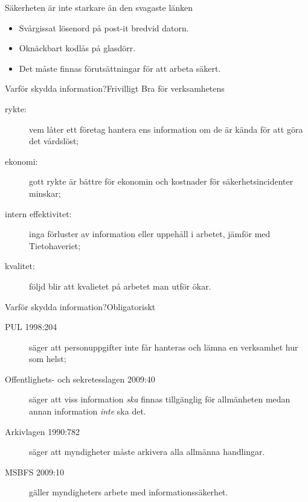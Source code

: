 \documentclass{beamer}
\begin{document}
\begin{frame}{Säkerheten är inte starkare än den svagaste länken}
  \begin{itemize}
    \item Svårgissat lösenord på post-it bredvid datorn.
    \item Oknäckbart kodlås på glasdörr.
    \item Det måste finnas förutsättningar för att arbeta säkert.
  \end{itemize}
\end{frame}

\begin{frame}{Varför skydda information?}{Frivilligt}
  Bra för verksamhetens
  \begin{description}
    \item[rykte:] vem låter ett företag hantera ens information om de är kända 
      för att göra det vårdslöst;

    \item[ekonomi:] gott rykte är bättre för ekonomin och kostnader för 
      säkerhetsincidenter minskar;

    \item[intern effektivitet:] inga förluster av information eller uppehåll 
      i arbetet, jämför med Tietohaveriet;

    \item[kvalitet:] följd blir att kvalietet på arbetet man utför ökar.

  \end{description}
\end{frame}

\begin{frame}{Varför skydda information?}{Obligatoriskt}
  \begin{description}
    \item[PUL 1998:204] säger att personuppgifter inte får hanteras och lämna 
      en verksamhet hur som helst;

    \item[Offentlighets- och sekretesslagen 2009:40] säger att viss information 
      \emph{ska} finnas tillgänglig för allmänheten medan annan information 
      \emph{inte} ska det.

    \item[Arkivlagen 1990:782] säger att myndigheter måste arkivera alla 
      allmänna handlingar.

    \item[MSBFS 2009:10] gäller myndigheters arbete med informationssäkerhet.

  \end{description}
\end{frame}
\end{document}
